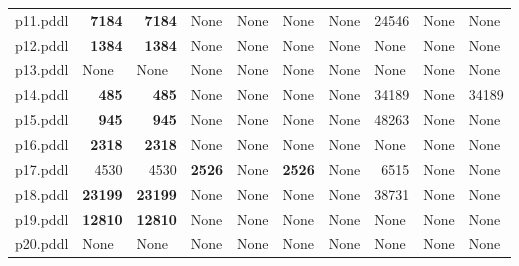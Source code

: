 \documentclass{article}
\begin{document}
\begin{tabular}{@{}lrrrrrrrrr@{}}
p11.pddl & \textbf{7184} & \textbf{7184} & \multicolumn{1}{|l|}{None} & \multicolumn{1}{|l|}{None} & \multicolumn{1}{|l|}{None} & \multicolumn{1}{|l|}{None} & 24546 & \multicolumn{1}{|l|}{None} & \multicolumn{1}{|l|}{None} \\
p12.pddl & \textbf{1384} & \textbf{1384} & \multicolumn{1}{|l|}{None} & \multicolumn{1}{|l|}{None} & \multicolumn{1}{|l|}{None} & \multicolumn{1}{|l|}{None} & \multicolumn{1}{|l|}{None} & \multicolumn{1}{|l|}{None} & \multicolumn{1}{|l|}{None} \\
p13.pddl & \multicolumn{1}{|l|}{None} & \multicolumn{1}{|l|}{None} & \multicolumn{1}{|l|}{None} & \multicolumn{1}{|l|}{None} & \multicolumn{1}{|l|}{None} & \multicolumn{1}{|l|}{None} & \multicolumn{1}{|l|}{None} & \multicolumn{1}{|l|}{None} & \multicolumn{1}{|l|}{None} \\
p14.pddl & \textbf{485} & \textbf{485} & \multicolumn{1}{|l|}{None} & \multicolumn{1}{|l|}{None} & \multicolumn{1}{|l|}{None} & \multicolumn{1}{|l|}{None} & 34189 & \multicolumn{1}{|l|}{None} & 34189 \\
p15.pddl & \textbf{945} & \textbf{945} & \multicolumn{1}{|l|}{None} & \multicolumn{1}{|l|}{None} & \multicolumn{1}{|l|}{None} & \multicolumn{1}{|l|}{None} & 48263 & \multicolumn{1}{|l|}{None} & \multicolumn{1}{|l|}{None} \\
p16.pddl & \textbf{2318} & \textbf{2318} & \multicolumn{1}{|l|}{None} & \multicolumn{1}{|l|}{None} & \multicolumn{1}{|l|}{None} & \multicolumn{1}{|l|}{None} & \multicolumn{1}{|l|}{None} & \multicolumn{1}{|l|}{None} & \multicolumn{1}{|l|}{None} \\
p17.pddl & 4530 & 4530 & \textbf{2526} & \multicolumn{1}{|l|}{None} & \textbf{2526} & \multicolumn{1}{|l|}{None} & 6515 & \multicolumn{1}{|l|}{None} & \multicolumn{1}{|l|}{None} \\
p18.pddl & \textbf{23199} & \textbf{23199} & \multicolumn{1}{|l|}{None} & \multicolumn{1}{|l|}{None} & \multicolumn{1}{|l|}{None} & \multicolumn{1}{|l|}{None} & 38731 & \multicolumn{1}{|l|}{None} & \multicolumn{1}{|l|}{None} \\
p19.pddl & \textbf{12810} & \textbf{12810} & \multicolumn{1}{|l|}{None} & \multicolumn{1}{|l|}{None} & \multicolumn{1}{|l|}{None} & \multicolumn{1}{|l|}{None} & \multicolumn{1}{|l|}{None} & \multicolumn{1}{|l|}{None} & \multicolumn{1}{|l|}{None} \\
p20.pddl & \multicolumn{1}{|l|}{None} & \multicolumn{1}{|l|}{None} & \multicolumn{1}{|l|}{None} & \multicolumn{1}{|l|}{None} & \multicolumn{1}{|l|}{None} & \multicolumn{1}{|l|}{None} & \multicolumn{1}{|l|}{None} & \multicolumn{1}{|l|}{None} & \multicolumn{1}{|l|}{None} \\
\end{tabular}
\end{document}
